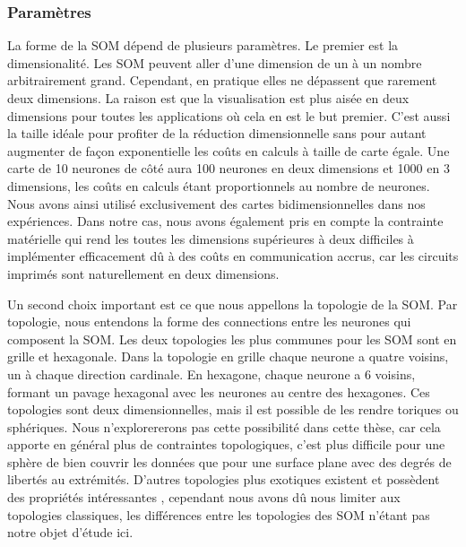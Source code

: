 \subsubsection{Paramètres}\label{param_som}

	La forme de la SOM dépend de plusieurs paramètres. Le premier est la dimensionalité. Les SOM peuvent aller d'une dimension de un à un nombre arbitrairement grand. Cependant, en pratique elles ne dépassent que rarement deux dimensions. La raison est que la visualisation est plus aisée en deux dimensions pour toutes les applications où cela en est le but premier. C'est aussi la taille idéale pour profiter de la réduction dimensionnelle sans pour autant augmenter de façon exponentielle les coûts en calculs à taille de carte égale. Une carte de 10 neurones de côté aura 100 neurones en deux dimensions et 1000 en 3 dimensions, les coûts en calculs étant proportionnels au nombre de neurones. Nous avons ainsi utilisé exclusivement des cartes bidimensionnelles dans nos expériences. Dans notre cas, nous avons également pris en compte la contrainte matérielle qui rend les toutes les dimensions supérieures à deux difficiles à implémenter efficacement dû à des coûts en communication accrus, car les circuits imprimés sont naturellement en deux dimensions.
	
	Un second choix important est ce que nous appellons la topologie de la SOM. Par topologie, nous entendons la forme des connections entre les neurones qui composent la SOM. Les deux topologies les plus communes pour les SOM sont en grille et hexagonale. Dans la topologie en grille chaque neurone a quatre voisins, un à chaque direction cardinale. En hexagone, chaque neurone a 6 voisins, formant un pavage hexagonal avec les neurones au centre des hexagones. Ces topologies sont deux dimensionnelles, mais il est possible de les rendre toriques ou sphériques. Nous n'explorererons pas cette possibilité dans cette thèse, car cela apporte en général plus de contraintes topologiques, c'est plus difficile pour une sphère de bien couvrir les données que pour une surface plane avec des degrés de libertés au extrémités. D'autres topologies plus exotiques existent et possèdent des propriétés intéressantes \cite{bernard2018np}, cependant nous avons dû nous limiter aux topologies classiques, les différences entre les topologies des SOM n'étant pas notre objet d'étude ici.

